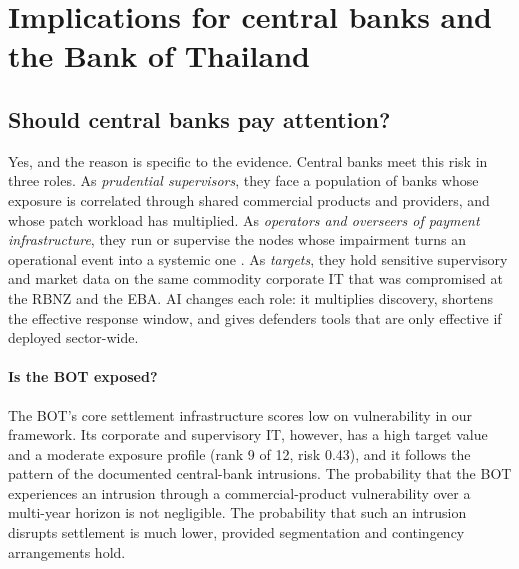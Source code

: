 \begin{table}[!htbp]
\centering
\caption{Robustness of scenario results to deployment probability $\rho$ and mass-campaign hit rate $c_{\text{mass}}$ (P(systemic) in \%, 1,000 years per cell).}
\label{tab:simrobust}
\scriptsize

\end{table}

\section{Implications for central banks and the Bank of Thailand}\label{sec:policy}

\subsection{Should central banks pay attention?}
Yes, and the reason is specific to the evidence. Central banks meet this risk in three roles. As \emph{prudential supervisors}, they face a population of banks whose exposure is correlated through shared commercial products and providers, and whose patch workload has multiplied. As \emph{operators and overseers of payment infrastructure}, they run or supervise the nodes whose impairment turns an operational event into a systemic one \citep{cpmi2016guidance,eisenbach2022cyber}. As \emph{targets}, they hold sensitive supervisory and market data on the same commodity corporate IT that was compromised at the RBNZ and the EBA. AI changes each role: it multiplies discovery, shortens the effective response window, and gives defenders tools that are only effective if deployed sector-wide.

\paragraph{Is the BOT exposed?} The BOT's core settlement infrastructure scores low on vulnerability in our framework. Its corporate and supervisory IT, however, has a high target value and a moderate exposure profile (rank 9 of 12, risk 0.43), and it follows the pattern of the documented central-bank intrusions. The probability that the BOT experiences an intrusion through a commercial-product vulnerability over a multi-year horizon is not negligible. The probability that such an intrusion disrupts settlement is much lower, provided segmentation and contingency arrangements hold.

